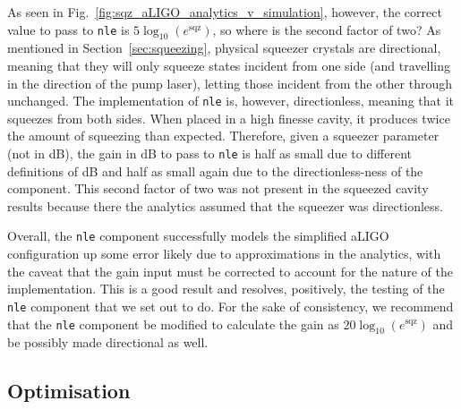 \documentclass[aps,pra,superscriptaddress,reprint,nofootinbib]{revtex4-1}
\newcommand{\code}[1]{\texttt{#1}}
\begin{document}
As seen in Fig.~\ref{fig:sqz_aLIGO_analytics_v_simulation}, however, the correct value to pass to \code{nle} is $5 \log_{10}(e^\mathrm{sqz})$, so where is the second factor of two? As mentioned in Section~\ref{sec:squeezing}, physical squeezer crystals are directional, meaning that they will only squeeze states incident from one side (and travelling in the direction of the pump laser), letting those incident from the other through unchanged. The implementation of \code{nle} is, however, directionless, meaning that it squeezes from both sides. When placed in a high finesse cavity, it produces twice the amount of squeezing than expected. Therefore, given a squeezer parameter (not in dB), the gain in dB to pass to \code{nle} is half as small due to different definitions of dB and half as small again due to the directionless-ness of the component. This second factor of two was not present in the squeezed cavity results because there the analytics assumed that the squeezer was directionless.


Overall, the \code{nle} component successfully models the simplified aLIGO configuration up some error likely due to approximations in the analytics, with the caveat that the gain input must be corrected to account for the nature of the implementation. This is a good result and resolves, positively, the testing of the \code{nle} component that we set out to do. For the sake of consistency, we recommend that the \code{nle} component be modified to calculate the gain as $20 \log_{10}(e^\mathrm{sqz})$ and be possibly made directional as well.


\subsection{Optimisation}
\end{document}
